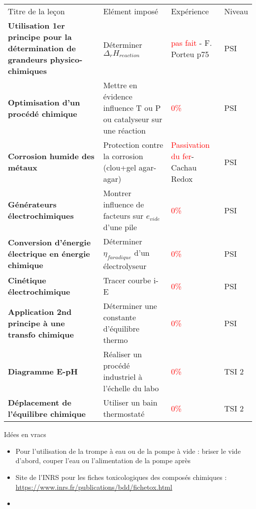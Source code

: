 \newpage
\begin{changemargin}{-1.5cm}{-0cm}
\begin{tabularx}{\paperwidth-2cm}{| X | X | X | X |}
  \hline
  \rowcolor{gray!20}\multicolumn{4}{c}{Avancement préparation oraux Leçons Chimie} \\
  \hline 
  Titre de la leçon & Elément imposé & Expérience & Niveau \\
  \hline
  \textbf{Utilisation 1er principe pour la détermination de grandeurs physico-chimiques} & Déterminer $\Delta_rH_{reaction}$ & \textcolor{red}{pas fait} - F. Porteu p75 & PSI \\
  \hline
  \textbf{Optimisation d'un procédé chimique} & Mettre en évidence influence T ou P ou catalyseur sur une réaction & \textcolor{red}{0\%} & PSI \\
  \hline
  \textbf{Corrosion humide des métaux} & Protection contre la corrosion (clou+gel agar-agar) & \textcolor{red}{Passivation du fer}-Cachau Redox & PSI \\
  \hline
  \textbf{Générateurs électrochimiques} & Montrer influence de facteurs sur $e_{vide}$ d'une pile & \textcolor{red}{0\%} & PSI \\
  \hline
  \textbf{Conversion d'énergie électrique en énergie chimique} & Déterminer $\eta_{faradique}$ d'un électrolyseur & \textcolor{red}{0\%} & PSI \\
  \hline
  \textbf{Cinétique électrochimique} & Tracer courbe i-E & \textcolor{red}{0\%} & PSI \\
  \hline
  \textbf{Application 2nd principe à une transfo chimique} & Déterminer une constante d'équilibre thermo & \textcolor{red}{0\%} & PSI \\
  \hline
  \hline
  \textbf{Diagramme E-pH} & Réaliser un procédé industriel à l'échelle du labo & \textcolor{red}{0\%} & TSI 2 \\
  \hline
  \textbf{Déplacement de l'équilibre chimique} & Utiliser un bain thermostaté & \textcolor{red}{0\%} & TSI 2 \\
  \hline  
\end{tabularx}

\end{changemargin}
\newpage
\begin{headerBlock}{\huge{Idées en vracs}}
\begin{itemize}
    \item Pour l'utilisation de la trompe à eau ou de la pompe à vide : briser le vide d'abord, couper l'eau ou l'alimentation de la pompe après
    \item Site de l'INRS pour les fiches toxicologiques des composés chimiques : \url{https://www.inrs.fr/publications/bdd/fichetox.html}
    \item 
\end{itemize}

\end{headerBlock}

